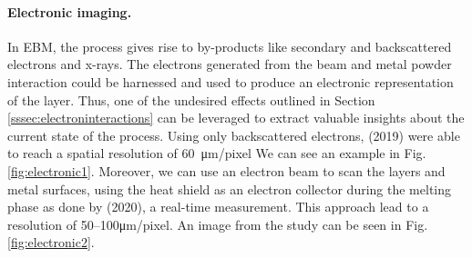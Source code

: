\paragraph{Electronic imaging.} In EBM, the process gives rise to by-products like secondary and backscattered electrons and x-rays. The electrons generated from the beam and metal powder interaction could be harnessed and used to produce an electronic representation of the layer. Thus, one of the undesired effects outlined in Section \ref{sssec:electroninteractions} can be leveraged to extract valuable insights about the current state of the process. Using only backscattered electrons, \citeauthor{wong_pilot_2019} (2019) were able to reach a spatial resolution of \SI{60}{\micro\metre / pixel} We can see an example in Fig. \ref{fig:electronic1}. Moreover, we can use an electron beam to scan the layers and metal surfaces, using the heat shield as an electron collector during the melting phase as done by \citeauthor{arnold_operando_2020} (2020), a real-time measurement. This approach lead to a resolution of \numrange[range-phrase=--]{50}{100}\unit{\micro\metre / pixel}. An image from the study can be seen in Fig. \ref{fig:electronic2}.
